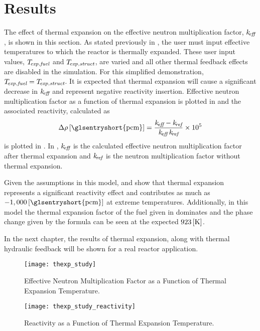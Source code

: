 \section{Results}
  The effect of thermal expansion on the effective neutron multiplication
  factor, $k_{\!\mbox{\scriptsize \em eff}}$, is shown in this section. As stated previously in
  , the user must input effective temperatures to which
  the reactor is thermally expanded. These user input values, ${T_{\!\mbox{\scriptsize \em exp,fuel}}}$ and
  $T_{\!\mbox{\scriptsize \em exp,struct}}$, are varied and all other thermal feedback effects are disabled
  in the simulation. For this simplified demonstration, ${T_{\!\mbox{\scriptsize \em exp,fuel}}}=T_{\!\mbox{\scriptsize \em exp,struct}}$.
  It is expected that thermal expansion will cause a significant decrease in
  $k_{\!\mbox{\scriptsize \em eff}}$ and represent negative reactivity insertion. Effective neutron
  multiplication factor as a function of thermal expansion is plotted in
   and the associated reactivity, calculated as
  \begin{equation}
    \label{eq:reactivity_formula}
    \Delta \rho \units{\glsentryshort{pcm}} = 
      \frac{\keff - \kref}{\keff \, \kref} \times 10^5
  \end{equation}
  is plotted in . In
  , $k_{\!\mbox{\scriptsize \em eff}}$ is the calculated effective neutron
  multiplication factor after thermal expansion and $k_{\!\mbox{\scriptsize \em ref}}$ is the neutron
  multiplication factor without thermal expansion. 

  Given the assumptions in this model,  and
   show that thermal expansion represents a
  significant reactivity effect and contributes as much as $-1,000
  \units{\glsentryshort{pcm}}$ at extreme temperatures. Additionally, in this
  model the thermal expansion factor of the fuel given in 
  dominates and the phase change given by the formula can be seen at the
  expected $923 \left[\text{{K}}\right]$.

  In the next chapter, the results of thermal expansion, along with thermal
  hydraulic feedback will be shown for a real reactor application.

  \begin{figure}
    \centering
    \texttt{[image: thexp\_study]}
    \caption{Effective Neutron Multiplication Factor as a Function of 
      Thermal Expansion Temperature.}
    \label{fig:thexp_study}
  \end{figure}

  \begin{figure}
    \centering
    \texttt{[image: thexp\_study\_reactivity]}
    \caption{Reactivity as a Function of Thermal Expansion Temperature.}
    \label{fig:thexp_study_reactivity}
  \end{figure}
